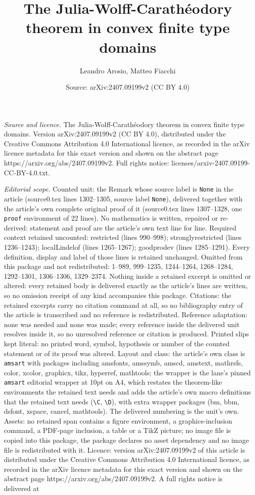 \documentclass[10pt,a4paper]{amsart}
\title[The Julia-Wolff-Carath\'eodory theorem in convex finite type]{The Julia-Wolff-Carath\'eodory theorem in convex finite type domains}
\author{Leandro Arosio, Matteo Fiacchi}
\date{Source: arXiv:2407.09199v2 (CC BY 4.0)}
\begin{document}
\maketitle

\noindent\emph{Source and licence.} The Julia-Wolff-Carath\'eodory theorem in convex finite type domains. Version arXiv:2407.09199v2 (CC BY 4.0), distributed under the Creative Commons Attribution 4.0 International licence, as recorded in the arXiv licence metadata for this exact version and shown on the abstract page https://arxiv.org/abs/2407.09199v2. Full rights notice: licenses/arxiv-2407.09199-CC-BY-4.0.txt.\par\smallskip

\noindent\textit{Editorial scope.} Counted unit: the Remark whose source label is \texttt{None} in the article (source0.tex lines 1302--1305, source label \texttt{None}), delivered together with the article's own complete original proof of it (source0.tex lines 1307--1328, one \texttt{proof} environment of 22 lines). No mathematics is written, repaired or re-derived: statement and proof are the article's own text line for line. Required context retained uncounted: restricted (lines 990--998); stronglyrestricted (lines 1236--1243); localLindelof (lines 1265--1267); goodprodev (lines 1285--1291). Every definition, display and label of those lines is retained unchanged. Omitted from this package and not redistributed: 1--989, 999--1235, 1244--1264, 1268--1284, 1292--1301, 1306--1306, 1329--2374. Nothing inside a retained excerpt is omitted or altered: every retained body is delivered exactly as the article's lines are written, so no omission receipt of any kind accompanies this package. Citations: the retained excerpts carry no citation command at all, so no bibliography entry of the article is transcribed and no reference is redistributed. Reference adaptation: none was needed and none was made; every reference inside the delivered unit resolves inside it, so no unresolved reference or citation is produced. Printed slips kept literal: no printed word, symbol, hypothesis or number of the counted statement or of its proof was altered. Layout and class: the article's own class is \texttt{amsart} with packages including amsfonts, amssymb, amscd, amstext, mathrsfs, color, xcolor, graphicx, tikz, hyperref, mathtools; the wrapper is the lane's pinned \texttt{amsart} editorial wrapper at 10pt on A4, which restates the theorem-like environments the retained text needs and adds the article's own macro definitions that the retained text needs (\texttt{\textbackslash C}, \texttt{\textbackslash D}), with extra wrapper packages (bm, bbm, dsfont, xspace, cancel, mathtools). The delivered numbering is the unit's own. Assets: no retained span contains a figure environment, a graphics-inclusion command, a PDF-page inclusion, a table or a TikZ picture; no image file is copied into this package, the package declares no asset dependency and no image file is redistributed with it. Licence: version arXiv:2407.09199v2 of this article is distributed under the Creative Commons Attribution 4.0 International licence, as recorded in the arXiv licence metadata for this exact version and shown on the abstract page https://arxiv.org/abs/2407.09199v2. A full rights notice is delivered at 
\end{document}
